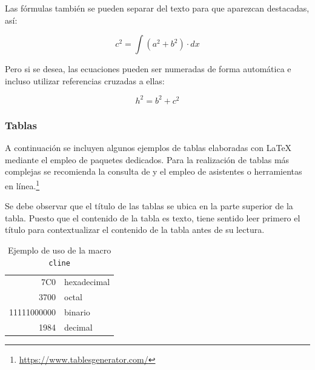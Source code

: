 Las fórmulas también se pueden separar del texto para que aparezcan destacadas, así:

\[
c^2  = \int {\left( {a^2  + b^2} \right)}  \cdot dx
\]

Pero si se desea, las ecuaciones pueden ser numeradas de forma automática e incluso utilizar referencias cruzadas a ellas:

\begin{equation} \label{eq:pitagoras}
	h^{2}=b^{2} + c^{2}
\end{equation}





\subsubsection{Tablas}
\label{sec:tablas}
A continuación se incluyen algunos ejemplos de tablas elaboradas con 
\LaTeX{} mediante el empleo de paquetes dedicados. Para la realización de tablas más complejas se recomienda la consulta de \cite{borbon21} y el empleo de asistentes o herramientas en línea.\footnote{\url{https://www.tablesgenerator.com/}}

Se debe observar que el título de las tablas se ubica en la parte superior de la tabla. Puesto que el contenido de la tabla es texto, tiene sentido leer primero el título para contextualizar el contenido de la tabla antes de su lectura.

\begin{table}[H]%
	\centering
	\caption{Ejemplo de uso de la macro \texttt{cline}}
	\label{tab:cline}
	\begin{tabular}[t]{|r|l|}
		\hline
		7C0 & hexadecimal \\[1cm] %
		3700 & octal \\ \cline{2-2}
		11111000000 & binario \\
		\hline \hline
		1984 & decimal \\
		\hline
	\end{tabular}
\end{table}


